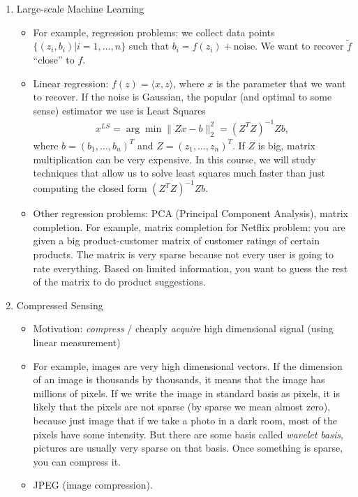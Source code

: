\documentclass[11pt]{article}
\begin{document}
\begin{enumerate}
\begin{itemize}
        \end{itemize}
    \item{Large-scale Machine Learning}
        \begin{itemize}
            \item{For example, regression problems: we collect data points $\{(z_i,b_i)|i=1,\ldots,n\}$ such that $b_i=f(z_i)+\text{noise}$. We want to recover $\tilde{f}$ ``close'' to $f$.}
            \item{Linear regression: $f(z) = \langle {x,z} \rangle$, where $x$ is the parameter that we want to recover. If the noise is Gaussian, the popular (and optimal to some sense) estimator we use is Least Squares 
        \begin{align}    
            x^{LS}=\arg\min \| Zx-b\|_2^2=(Z^TZ)^{-1}Zb, 
         \end{align} 
            where $b=(b_1,\ldots, b_n)^T$ and $Z=(z_1,\ldots, z_n)^T$. If $Z$ is big, matrix multiplication can be very expensive. In this course, we will study techniques that allow us to solve least squares much faster than just computing the closed form $(Z^TZ)^{-1}Zb$.}
            \item{Other regression problems: PCA (Principal Component Analysis), matrix completion. For example, matrix completion for Netflix problem: you are given a big product-customer matrix of customer ratings of certain products. The matrix is very sparse because not every user is going to rate everything.  Based on limited information, you want to guess the rest of the matrix to do product suggestions.}
        \end{itemize}
    \item{Compressed Sensing}
        \begin{itemize}
            \item{Motivation: {\em compress} / cheaply {\em acquir}e high dimensional signal (using linear measurement)}
            \item{For example, images are very high dimensional vectors. If the dimension of an image is thousands by thousands, it means that the image has millions of pixels. If we write the image in standard basis as pixels, it is likely that the pixels are not sparse (by sparse we mean almost zero), because just image that if we take a photo in a dark room, most of the pixels have some intensity. But there are some basis called {\em wavelet basis}, pictures are usually very sparse on that basis. Once something is sparse, you can compress it. }
            \item{JPEG (image compression).}

\end{itemize}
\end{enumerate}
\end{document}

